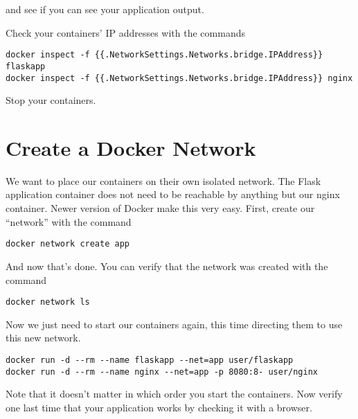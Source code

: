 \documentclass{article}
\begin{document}
and see if you can see your application output. 

Check your containers' IP addresses with the commands

\begin{verbatim}
docker inspect -f {{.NetworkSettings.Networks.bridge.IPAddress}} flaskapp 
docker inspect -f {{.NetworkSettings.Networks.bridge.IPAddress}} nginx
\end{verbatim}

Stop your containers.

\section{Create a Docker Network}
We want to place our containers on their own isolated network. The Flask application container does not need to be reachable by anything but our nginx container. Newer version of Docker make this very easy. First, create our ``network'' with the command

\texttt{docker network create app}

And now that's done. You can verify that the network was created with the command

\texttt{docker network ls}

Now we just need to start our containers again, this time directing them to use this new network.

\begin{verbatim}
docker run -d --rm --name flaskapp --net=app user/flaskapp
docker run -d --rm --name nginx --net=app -p 8080:8- user/nginx
\end{verbatim}

Note that it doesn't matter in which order you start the containers. Now verify one last time that your application works by checking it with a browser.
\end{document}
